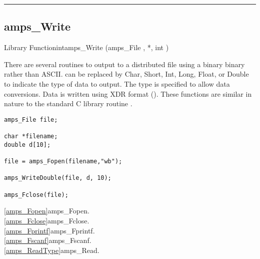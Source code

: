 \noindent\rule{\textwidth}{1mm}

\subsection{amps\_Write}
\label{amps_Write}


\begin{deftypefn}{Library Function}{int}{amps\_Write}
(amps_File ,  *, int )

\DESCRIPTION

There are several routines to output to a distributed file using a
binary binary rather than ASCII.   can be replaced by Char,
Short, Int, Long, Float, or Double to indicate the type of data to
output.  The type is specified to allow data conversions.  Data is
written using XDR format (\cite{xdr.87}).  These functions are
similar in nature to the standard C library routine .

\EXAMPLE
\begin{display}\begin{verbatim}
amps_File file;

char *filename;
double d[10];

file = amps_Fopen(filename,"wb");

amps_WriteDouble(file, d, 10);

amps_Fclose(file);
\end{verbatim}\end{display}

\SEEALSO
\vref{amps_Fopen}{amps\_Fopen}. \\
\vref{amps_Fclose}{amps\_Fclose}. \\
\vref{amps_Fprintf}{amps\_Fprintf}. \\
\vref{amps_Fscanf}{amps\_Fscanf}. \\
\vref{amps_ReadType}{amps\_Read}. \\

\end{deftypefn}


